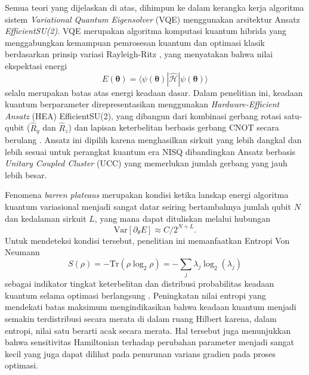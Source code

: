 Semua teori yang dijelaskan di atas, dihimpun ke dalam kerangka kerja algoritma sistem \textit{Variational Quantum Eigensolver} (VQE) menggunakan arsitektur Ansatz \textit{EfficientSU(2)}. VQE merupakan algoritma komputasi kuantum hibrida yang menggabungkan kemampuan pemrosesan kuantum dan optimasi klasik berdasarkan prinsip variasi Rayleigh-Ritz \cite{fedorov_vqe_2022,dixit_variational_2025}, yang menyatakan bahwa nilai ekspektasi energi 
\begin{equation}
E(\boldsymbol{\theta}) = \langle\psi(\boldsymbol{\theta})|\hat{\mathcal{H}}|\psi(\boldsymbol{\theta})\rangle
\end{equation}
selalu merupakan batas atas energi keadaan dasar. Dalam penelitian ini, keadaan kuantum berparameter direpresentasikan menggunakan \textit{Hardware-Efficient Ansatz} (HEA) EfficientSU(2), yang dibangun dari kombinasi gerbang rotasi satu-qubit ($\hat{R}_y$ dan $\hat{R}_z$) dan lapisan keterbelitan berbasis gerbang CNOT secara berulang \cite{dao_exploring_2025}. Ansatz ini dipilih karena menghasilkan sirkuit yang lebih dangkal dan lebih sesuai untuk perangkat kuantum era NISQ dibandingkan Ansatz berbasis \textit{Unitary Coupled Cluster} (UCC) yang memerlukan jumlah gerbang yang jauh lebih besar.

Fenomena \textit{barren plateaus} merupakan kondisi ketika lanskap energi algoritma kuantum variasional menjadi sangat datar seiring bertambahnya jumlah qubit $N$ dan kedalaman sirkuit $L$, yang mana dapat dituliskan melalui hubungan 
\begin{equation}\text{Var}[\partial_\theta E] \approx C/2^{N+L}.
\end{equation}
Untuk mendeteksi kondisi tersebut, penelitian ini memanfaatkan Entropi Von Neumann \cite{ohya_fundamentals_1998,crosato_shannon_2023}
\begin{equation}
S(\rho) = -\text{Tr}(\rho \log_2 \rho) = -\sum_j \lambda_j \log_2(\lambda_j)
\end{equation}
sebagai indikator tingkat keterbelitan dan distribusi probabilitas keadaan kuantum selama optimasi berlangsung \cite{serafini_symplectic_2003}. Peningkatan nilai entropi yang mendekati batas maksimum mengindikasikan bahwa keadaan kuantum menjadi semakin terdistribusi secara merata di dalam ruang Hilbert karena, dalam entropi, nilai satu berarti acak secara merata. Hal tersebut juga menunjukkan bahwa sensitivitas Hamiltonian terhadap perubahan parameter menjadi sangat kecil yang juga dapat dilihat pada penurunan varians gradien pada proses optimasi.
